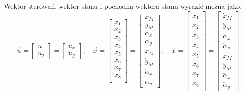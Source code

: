 \documentclass[10pt]{article}
\begin{document}
Wektor sterowań, wektor stanu i pochodną wektora stanu wyrazić można jako:
\begin{equation}
\vec{u} = \begin{bmatrix} u_1 \\ u_2 \end{bmatrix} = \begin{bmatrix} u_x \\ u_y \end{bmatrix}, \quad
\vec{x} = 
\begin{bmatrix}
x_1 \\ x_2 \\ x_3 \\ x_4 \\ x_5 \\ x_6 \\ x_7 \\ x_8 \\
\end{bmatrix} =
\begin{bmatrix}
x_M \\ y_M \\ \alpha_x \\ \alpha_y \\ \dot{x}_M \\ \dot{y}_M \\ \dot{\alpha}_x \\ \dot{\alpha}_y
\end{bmatrix}, \quad
\dot{\vec{x}} =
\begin{bmatrix}
\dot{x}_1 \\ \dot{x}_2 \\ \dot{x}_3 \\ \dot{x}_4 \\ \dot{x}_5 \\ \dot{x}_6 \\ \dot{x}_7 \\ \dot{x}_8 \\
\end{bmatrix} =
\begin{bmatrix}
\dot{x}_M \\ \dot{y}_M \\ \dot{\alpha}_x \\ \dot{\alpha}_y \\
\ddot{x}_M \\ \ddot{y}_M \\ \ddot{\alpha}_x \\ \ddot{\alpha}_y
\end{bmatrix}
\end{equation}
\end{document}
